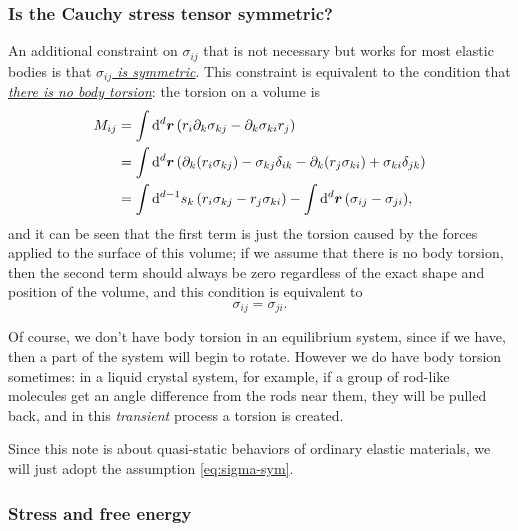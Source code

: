 \documentclass[hyperref, a4paper]{article}
\begin{document}
\subsubsection{Is the Cauchy stress tensor symmetric?}

An additional constraint on $\sigma_{ij}$ that is not necessary 
but works for most elastic bodies is that 
\ul{\emph{$\sigma_{ij}$ is symmetric}}.
This constraint is equivalent to the condition 
that \ul{\emph{there is no body torsion}}:
the torsion on a volume is 
\begin{equation}
    \begin{aligned}
        M_{ij} &= \int \dd[d]{\vb*{r}} 
        \left(
            r_i \partial_k \sigma_{kj} - \partial_k \sigma_{ki} r_j
        \right) \\
        &= \int \dd[d]{\vb*{r}} \left(
            \partial_k(r_i \sigma_{kj}) - \sigma_{kj} \delta_{ik}
            - \partial_k (r_j \sigma_{ki}) + \sigma_{ki} \delta_{jk}
        \right) \\
        &= \int \dd[d-1]{s_k} (r_i \sigma_{kj} - r_j \sigma_{ki})
        - \int \dd[d]{\vb*{r}} (\sigma_{ij} - \sigma_{ji}),
    \end{aligned}
\end{equation}
and it can be seen that the first term is just the torsion caused 
by the forces applied to the surface of this volume;
if we assume that there is no body torsion,
then the second term should always be zero regardless 
of the exact shape and position of the volume,
and this condition is equivalent to 
\begin{equation}
    \sigma_{ij} = \sigma_{ji}.
    \label{eq:sigma-sym}
\end{equation}

Of course, we don't have body torsion in an equilibrium system,
since if we have, 
then a part of the system will begin to rotate.
However we do have body torsion sometimes: 
in a liquid crystal system, for example, 
if a group of rod-like molecules get an angle difference 
from the rods near them,
they will be pulled back, 
and in this \emph{transient} process a torsion is created.

Since this note is about quasi-static behaviors of ordinary elastic materials,
we will just adopt the assumption \eqref{eq:sigma-sym}.

\subsubsection{Stress and free energy}
\end{document}
